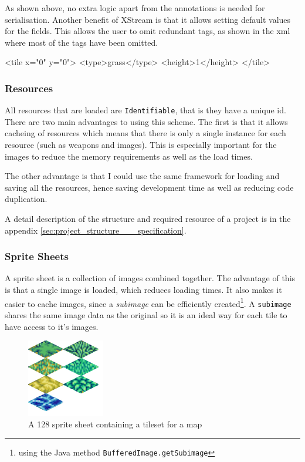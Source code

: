 As shown above, no extra logic apart from the annotations is needed for serialisation.  Another benefit of XStream is that it allows setting default values for the fields. This allows the user to omit redundant tags, as shown in the xml where most of the tags have been omitted.
\begin{lst:tile}[caption=Serialised form of the above class. ]
<tile x="0" y="0">
	<type>grass</type>
	<height>1</height>
</tile>
\end{lst:tile}

\subsubsection{Resources}

All resources that are loaded are \texttt{Identifiable}, that is they have a unique id.  There are two main advantages to using this scheme. The first is that it allows cacheing of resources which means that there is only a single instance for each resource (such as weapons and images). This is especially important for the images to reduce the memory requirements as well as the load times.

The other advantage is that I could use the same framework for loading and saving all the resources, hence saving development time as well as reducing code duplication. 

A detail description of the structure and  required resource of a project is in the appendix \ref{sec:project_structure___specification}.

\subsubsection{Sprite Sheets}
\label{ssub:sprite_sheets}


A sprite sheet is a collection of images combined together. The advantage of this is that a single image is loaded, which reduces loading times. It also makes it easier to cache images, since a \emph{subimage} can be efficiently created\footnote{using the Java method \texttt{BufferedImage.getSubimage}}. A \texttt{subimage} shares the same image data as the original so it is an ideal way for each tile to have access to it's images\cite{bufferedImage}.    

\begin{figure}[htbp]
	\centering
		\includegraphics{figures/tileset.png}
	\caption{A 128 sprite sheet containing a tileset for a map}
	\label{fig:figures_tileset}
\end{figure}

